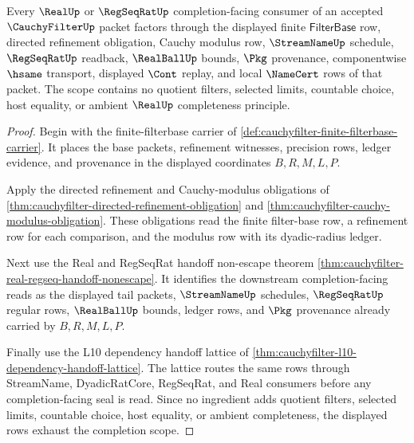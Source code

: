 \begin{theorem}
\label{thm:cauchyfilter-real-regseq-completion-scope}
Every $\RealUp$ or $\RegSeqRatUp$ completion-facing consumer of an accepted
$\CauchyFilterUp$ packet factors through the displayed finite
$\mathsf{FilterBase}$ row, directed refinement obligation, Cauchy modulus
row, $\StreamNameUp$ schedule, $\RegSeqRatUp$ readback, $\RealBallUp$ bounds,
$\Pkg$ provenance, componentwise $\hsame$ transport, displayed $\Cont$
replay, and local $\NameCert$ rows of that packet. The scope contains no
quotient filters, selected limits, countable choice, host equality, or
ambient $\RealUp$ completeness principle.
\end{theorem}
\begin{proof}
Begin with the finite-filterbase carrier of
\autoref{def:cauchyfilter-finite-filterbase-carrier}. It places the base
packets, refinement witnesses, precision rows, ledger evidence, and
provenance in the displayed coordinates $B,R,M,L,P$.

Apply the directed refinement and Cauchy-modulus obligations of
\autoref{thm:cauchyfilter-directed-refinement-obligation} and
\autoref{thm:cauchyfilter-cauchy-modulus-obligation}. These obligations read
the finite filter-base row, a refinement row for each comparison, and the
modulus row with its dyadic-radius ledger.

Next use the Real and RegSeqRat handoff non-escape theorem
\autoref{thm:cauchyfilter-real-regseq-handoff-nonescape}. It identifies the
downstream completion-facing reads as the displayed tail packets,
$\StreamNameUp$ schedules, $\RegSeqRatUp$ regular rows, $\RealBallUp$ bounds,
ledger rows, and $\Pkg$ provenance already carried by $B,R,M,L,P$.

Finally use the L10 dependency handoff lattice of
\autoref{thm:cauchyfilter-l10-dependency-handoff-lattice}. The lattice routes
the same rows through StreamName, DyadicRatCore, RegSeqRat, and Real consumers
before any completion-facing seal is read. Since no ingredient adds quotient
filters, selected limits, countable choice, host equality, or ambient
completeness, the displayed rows exhaust the completion scope.
\end{proof}

